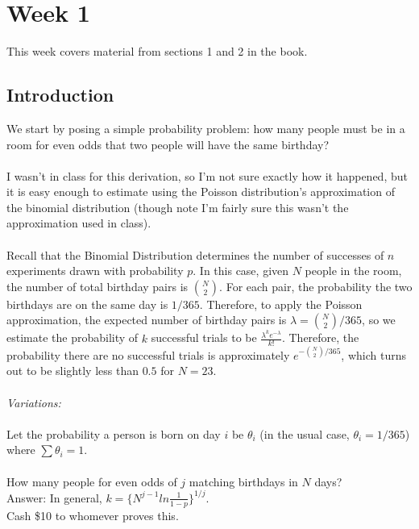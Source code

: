 \documentclass[12pt]{article}
\begin{document}
\section{Week 1}
This week covers material from sections 1 and 2 in the book.

\subsection{Introduction}
We start by posing a simple probability problem: how many people must be in a room for even odds that two people will have the same birthday?
\\ \\
I wasn't in class for this derivation, so I'm not sure exactly how it happened, but it is easy enough to estimate using the Poisson distribution's approximation of the binomial distribution (though note I'm fairly sure this wasn't the approximation used in class).
\\ \\
Recall that the Binomial Distribution determines the number of successes of $n$ experiments drawn with probability $p$.  In this case, given $N$ people in the room, the number of total birthday pairs is ${N \choose 2}$.  For each pair, the probability the two birthdays are on the same day is $1/365$.  Therefore, to apply the Poisson approximation, the expected number of birthday pairs is $\lambda = {N \choose 2}/365$, so we estimate the probability of $k$ successful trials to be $\frac{\lambda^k e^{-\lambda}}{k!}$.  Therefore, the probability there are no successful trials is approximately $e^{-{N \choose 2}/365}$, which turns out to be slightly less than $0.5$ for $N = 23$.
\\ \\
{\it Variations:}\\ \\
Let the probability a person is born on day $i$ be $\theta_i$ (in the usual case, $\theta_i = 1/365$) where $\sum \theta_i = 1$.
\\ \\
How many people for even odds of $j$ matching birthdays in $N$ days? \\
Answer: In general, $k = \{ N^{j-1} ln \frac{1}{1-p} \}^{1/j}$.\\
Cash \$10 to whomever proves this.
\\ \\
\end{document}
